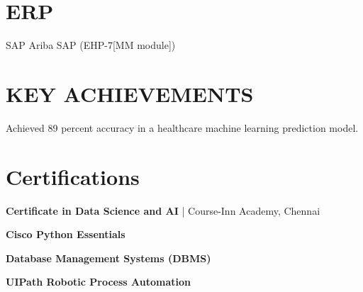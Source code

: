 \documentclass[]{deedy-resume-reversed}
\begin{document}
\begin{minipage}[t]{0.30\textwidth}
\section{ERP}

\textbullet{} SAP Ariba \textbullet{} SAP
(EHP-7[MM module])

\sectionsep


\section{KEY ACHIEVEMENTS}

\textbullet{} Achieved 89 percent accuracy in a healthcare machine learning prediction model.

\sectionsep


\section{Certifications}

\textbullet{} \textbf{Certificate in Data Science and AI} | Course-Inn Academy, Chennai

\textbullet{} \textbf{Cisco Python Essentials}

\textbullet{} \textbf{Database Management Systems (DBMS)}

\textbullet{} \textbf{UIPath Robotic Process Automation}

\sectionsep


\end{minipage}
\end{document}
